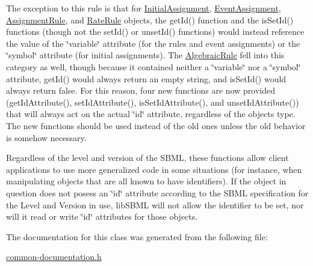 The exception to this rule is that for \hyperlink{class_initial_assignment}{Initial\+Assignment}, \hyperlink{class_event_assignment}{Event\+Assignment}, \hyperlink{class_assignment_rule}{Assignment\+Rule}, and \hyperlink{class_rate_rule}{Rate\+Rule} objects, the get\+Id() function and the is\+Set\+Id() functions (though not the set\+Id() or unset\+Id() functions) would instead reference the value of the \char`\"{}variable\char`\"{} attribute (for the rules and event assignments) or the \char`\"{}symbol\char`\"{} attribute (for initial assignments). The \hyperlink{class_algebraic_rule}{Algebraic\+Rule} fell into this category as well, though because it contained neither a \char`\"{}variable\char`\"{} nor a \char`\"{}symbol\char`\"{} attribute, get\+Id() would always return an empty string, and is\+Set\+Id() would always return {\ttfamily false}. For this reason, four new functions are now provided (get\+Id\+Attribute(), set\+Id\+Attribute(), is\+Set\+Id\+Attribute(), and unset\+Id\+Attribute()) that will always act on the actual \char`\"{}id\char`\"{} attribute, regardless of the object\textquotesingle{}s type. The new functions should be used instead of the old ones unless the old behavior is somehow necessary.

Regardless of the level and version of the S\+B\+ML, these functions allow client applications to use more generalized code in some situations (for instance, when manipulating objects that are all known to have identifiers). If the object in question does not posess an \char`\"{}id\char`\"{} attribute according to the S\+B\+ML specification for the Level and Version in use, lib\+S\+B\+ML will not allow the identifier to be set, nor will it read or write \char`\"{}id\char`\"{} attributes for those objects. 

The documentation for this class was generated from the following file\+:\begin{DoxyCompactItemize}
\item 
\hyperlink{common-documentation_8h}{common-\/documentation.\+h}\end{DoxyCompactItemize}
